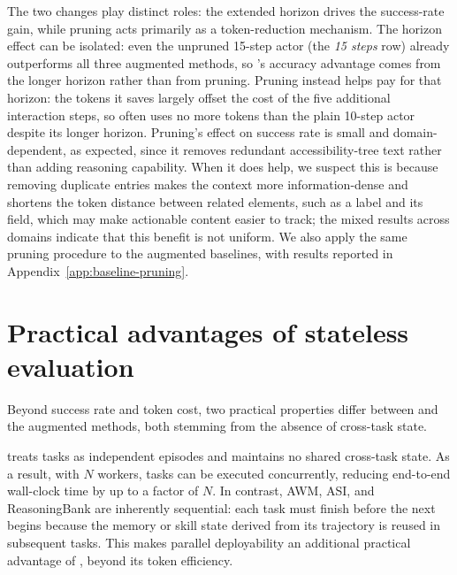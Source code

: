 The two changes play distinct roles: the extended horizon drives the success-rate gain, while pruning acts primarily as a token-reduction mechanism.
The horizon effect can be isolated: even the unpruned 15-step actor (the \emph{15 steps} row) already outperforms all three augmented methods, so \budgetactor{}'s accuracy advantage comes from the longer horizon rather than from pruning.
Pruning instead helps pay for that horizon: the tokens it saves largely offset the cost of the five additional interaction steps, so \budgetactor{} often uses no more tokens than the plain 10-step actor despite its longer horizon.
Pruning's effect on success rate is small and domain-dependent, as expected, since it removes redundant accessibility-tree text rather than adding reasoning capability.
When it does help, we suspect this is because removing duplicate entries makes the context more information-dense and shortens the token distance between related elements, such as a label and its field, which may make actionable content easier to track; the mixed results across domains indicate that this benefit is not uniform.
We also apply the same pruning procedure to the augmented baselines, with results reported in Appendix~\ref{app:baseline-pruning}.


\section{Practical advantages of stateless evaluation}
\label{sec:practical}

Beyond success rate and token cost, two practical properties differ between \budgetactor{} and the augmented methods, both stemming from the absence of cross-task state.

 \budgetactor{} treats tasks as independent episodes and maintains no shared cross-task state.
As a result, with $N$ workers, tasks can be executed concurrently, reducing end-to-end wall-clock time by up to a factor of $N$.
In contrast, AWM, ASI, and ReasoningBank are inherently sequential: each task must finish before the next begins because the memory or skill state derived from its trajectory is reused in subsequent tasks.
This makes parallel deployability an additional practical advantage of \budgetactor{}, beyond its token efficiency.


